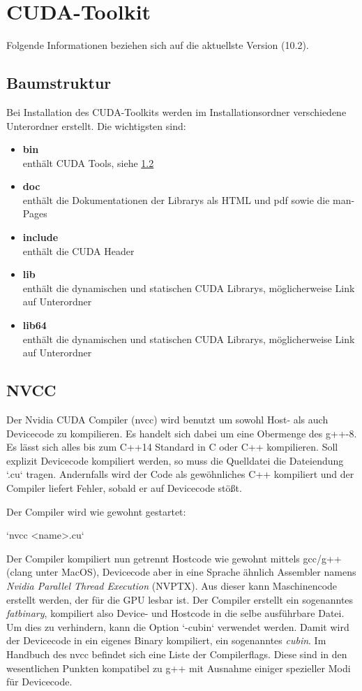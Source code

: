 		\section{CUDA-Toolkit}
		Folgende Informationen beziehen sich auf die aktuellste Version (10.2).
		
			\subsection{Baumstruktur}\label{tree}
			Bei Installation des CUDA-Toolkits werden im Installationsordner verschiedene Unterordner erstellt. Die wichtigsten sind:
			\begin{itemize}
			    \item \textbf{bin}\\ enthält CUDA Tools, siehe \ref{tools}
			    \item \textbf{doc}\\ enthält die Dokumentationen der Librarys als HTML und pdf sowie die man-Pages
			    \item \textbf{include}\\ enthält die CUDA Header
			    \item \textbf{lib}\\ enthält die dynamischen und statischen CUDA Librarys, möglicherweise Link auf Unterordner
			    \item \textbf{lib64}\\ enthält die dynamischen und statischen CUDA Librarys, möglicherweise Link auf Unterordner
			\end{itemize}
			\subsection{NVCC}\label{tools}
			Der Nvidia CUDA Compiler (\gls{nvcc}) wird benutzt um sowohl Host- als auch Devicecode zu kompilieren. Es handelt sich dabei um eine Obermenge des g++-8. Es lässt sich alles bis zum C++14 Standard in C oder C++ kompilieren. Soll explizit Devicecode kompiliert werden, so muss die Quelldatei die Dateiendung \li`.cu` tragen. Andernfalls wird der Code als gewöhnliches C++ kompiliert und der Compiler liefert Fehler, sobald er auf Devicecode stößt.
		
			Der Compiler wird wie gewohnt gestartet:
		
			\li`nvcc <name>.cu`
		
			Der Compiler kompiliert nun getrennt Hostcode wie gewohnt mittels gcc/g++ (clang unter MacOS), Devicecode aber in eine Sprache ähnlich Assembler namens \textit{Nvidia Parallel Thread Execution} (\Gls{NVPTX}). Aus dieser kann Maschinencode erstellt werden, der für die GPU lesbar ist. Der Compiler erstellt ein sogenanntes \textit{fatbinary}, kompiliert also Device- und Hostcode in die selbe ausführbare Datei. Um dies zu verhindern, kann die Option \li`-cubin` verwendet werden. Damit wird der Devicecode in ein eigenes Binary kompiliert, ein sogenanntes \textit{cubin}. Im Handbuch des \gls{nvcc} \autocite{cudaNVCC} befindet sich eine Liste der Compilerflags. Diese sind in den wesentlichen Punkten kompatibel zu g++ mit Ausnahme einiger spezieller Modi für Devicecode.
		
